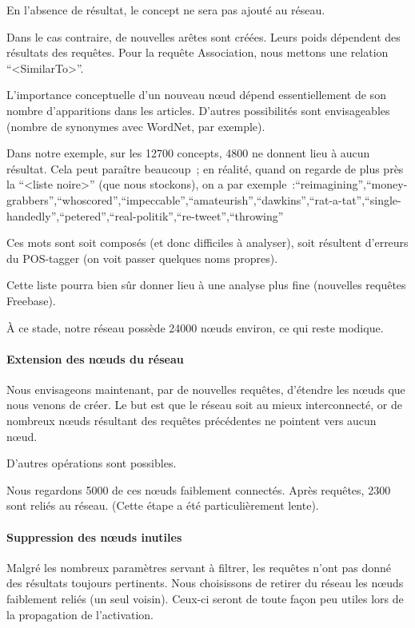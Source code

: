 \documentclass[a4paper, 12pt]{article}
\begin{document}
En l'absence de résultat, le concept ne sera pas ajouté au réseau.

Dans le cas contraire, de nouvelles arêtes sont créées. Leurs poids dépendent des résultats des requêtes. Pour la requête Association, nous mettons une relation ``<SimilarTo>''.

L'importance conceptuelle d'un nouveau nœud dépend essentiellement de son nombre d'apparitions dans les articles. D'autres possibilités sont envisageables (nombre de synonymes avec WordNet, par exemple).

Dans notre exemple, sur les 12700 concepts, 4800 ne donnent lieu à aucun résultat. Cela peut paraître beaucoup~; en réalité, quand on regarde de plus près la ``<liste noire>'' (que nous stockons), on a par exemple~:``reimagining'',``money-grabbers'',``whoscored'',``impeccable'',``amateurish'',``dawkins'',``rat-a-tat'',``single-handedly'',``petered'',``real-politik'',``re-tweet'',``throwing''

Ces mots sont soit composés (et donc difficiles à analyser), soit résultent d'erreurs du POS-tagger (on voit passer quelques noms propres).

Cette liste pourra bien sûr donner lieu à une analyse plus fine (nouvelles requêtes Freebase).

\`A ce stade, notre réseau possède 24000 nœuds environ, ce qui reste modique.

\paragraph{Extension des nœuds du réseau}

Nous envisageons maintenant, par de nouvelles requêtes, d'étendre les nœuds que nous venons de créer. Le but est que le réseau soit au mieux interconnecté, or de nombreux nœuds résultant des requêtes précédentes ne pointent vers aucun nœud.

D'autres opérations sont possibles.

Nous regardons 5000 de ces nœuds faiblement connectés. Après requêtes, 2300 sont reliés au réseau. (Cette étape a été particulièrement lente).

\paragraph{Suppression des nœuds inutiles}

Malgré les nombreux paramètres servant à filtrer, les requêtes n'ont pas donné des résultats toujours pertinents. Nous choisissons de retirer du réseau les nœuds faiblement reliés (un seul voisin). Ceux-ci seront de toute fa\c{c}on peu utiles lors de la propagation de l'activation.
\end{document}
